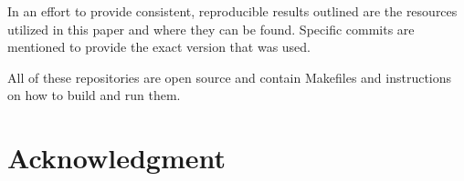 \documentclass[sigconf]{acmart}
\begin{document}
In an effort to provide consistent, reproducible results outlined are the
resources utilized in this paper and where they can be found.
Specific commits are mentioned to provide the exact version that was used.


All of these repositories are open source and contain Makefiles
and instructions on how to build and run them.

\section*{Acknowledgment}




\end{document}
